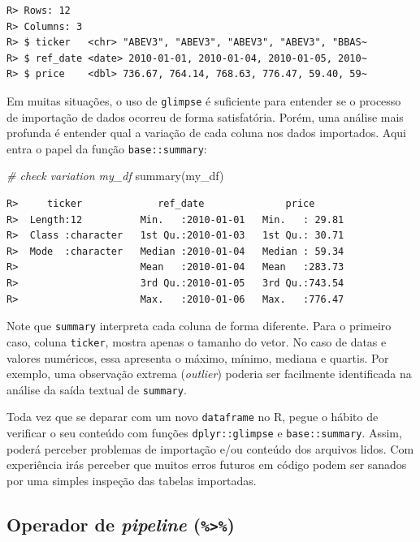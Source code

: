 \documentclass[
  11pt,
]{book}
\newenvironment{Shaded}{\begin{snugshade}}{\end{snugshade}}
\newcommand{\CommentTok}[1]{\textcolor[rgb]{0.37,0.37,0.37}{\textit{#1}}}
\newcommand{\FunctionTok}[1]{\textcolor[rgb]{0,0,0}{#1}}
\newcommand{\NormalTok}[1]{#1}
\newenvironment{rmdimportant}
{\begin{importantblock}

	} {\end{importantblock}}
\begin{document}
\begin{verbatim}
R> Rows: 12
R> Columns: 3
R> $ ticker   <chr> "ABEV3", "ABEV3", "ABEV3", "ABEV3", "BBAS~
R> $ ref_date <date> 2010-01-01, 2010-01-04, 2010-01-05, 2010~
R> $ price    <dbl> 736.67, 764.14, 768.63, 776.47, 59.40, 59~
\end{verbatim}

Em muitas situações, o uso de \texttt{glimpse} é suficiente para entender se o processo de importação de dados ocorreu de forma satisfatória. Porém, uma análise mais profunda é entender qual a variação de cada coluna nos dados importados. Aqui entra o papel da função \texttt{base::summary}:

\begin{Shaded}
\begin{Highlighting}[]
\CommentTok{\# check variation my\_df}
\FunctionTok{summary}\NormalTok{(my\_df)}
\end{Highlighting}
\end{Shaded}

\begin{verbatim}
R>     ticker             ref_date              price       
R>  Length:12          Min.   :2010-01-01   Min.   : 29.81  
R>  Class :character   1st Qu.:2010-01-03   1st Qu.: 30.71  
R>  Mode  :character   Median :2010-01-04   Median : 59.34  
R>                     Mean   :2010-01-04   Mean   :283.73  
R>                     3rd Qu.:2010-01-05   3rd Qu.:743.54  
R>                     Max.   :2010-01-06   Max.   :776.47
\end{verbatim}

Note que \texttt{summary} interpreta cada coluna de forma diferente. Para o primeiro caso, coluna \texttt{ticker}, mostra apenas o tamanho do vetor. No caso de datas e valores numéricos, essa apresenta o máximo, mínimo, mediana e quartis. Por exemplo, uma observação extrema (\emph{outlier}) poderia ser facilmente identificada na análise da saída textual de \texttt{summary}.

\begin{rmdimportant}
Toda vez que se deparar com um novo \texttt{dataframe} no R, pegue o
hábito de verificar o seu conteúdo com funções \texttt{dplyr::glimpse} e
\texttt{base::summary}. Assim, poderá perceber problemas de importação
e/ou conteúdo dos arquivos lidos. Com experiência irás perceber que
muitos erros futuros em código podem ser sanados por uma simples
inspeção das tabelas importadas.
\end{rmdimportant}

\hypertarget{operador-de-pipeline}{%
\subsection{\texorpdfstring{Operador de \emph{pipeline} (\texttt{\%\textgreater{}\%})}{Operador de pipeline (\%\textgreater\%)}}\label{operador-de-pipeline}}
\end{document}

